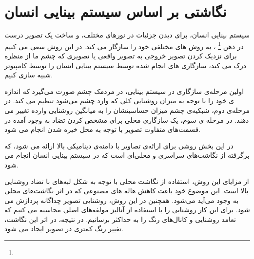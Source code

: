 
\section{نگاشتی بر اساس سیستم بینایی انسان}
سیستم بینایی انسان، برای دیدن جزئیات در نورهای مختلف، و ساخت یک تصویر درست در ذهن
\footnote{}
، به روش های مختلفی خود را سازگار می کند.
 در این روش سعی می کنیم برای نزدیک کردن تصویر خروجی به تصویر واقعی یا تصویری که چشم ما از منظره درک می کند، سازگاری های انجام شده توسط سیستم بینایی انسان را توسط کامپیوتر شبیه سازی کنیم. 
 
 اولین مرحله‌ی سازگاری در سیستم بینایی، در مردمک چشم صورت می‌گیرد که اندازه ی خود را با توجه به میزان روشنایی کلی که وارد چشم می‌شود تنظیم می کند. در مرحله‌ی دوم، شبکیه‌ی چشم میزان حساسیتشان را به میانگین روشنایی وارده تغییر می دهند. در مرحله ی سوم، یک سازگاری محلی برای مشخص کردن تضاد به وجود آمده در قسمت‌های متفاوت تصویر با توجه به محل خیره شدن انجام می شود.
 
در این بخش روشی برای ارائه‌ی تصاویر با دامنه‌ی دینامیکی بالا ارائه می شود، که برگرفته از نگاشت‌های سراسری و محلی‌ای است که در سیستم بینایی انسان انجام می شود. 

از مزایای این روش، استفاده از نگاشت محلی با توجه به شکل لبه‌های با تضاد روشنایی بالا است. این موضوع خود باعث کاهش هاله های مصنوعی که در اثر نگاشت‌های محلی به وجود می‌آید می‌شود.
همچنین در این روش،  روشنایی تصویر  چداگانه پردازش می شود. برای این کار روشنایی را با استفاده از آنالیز مولفه‌های اصلی محاسبه می کنیم که تعامد روشنایی و کانال‌های رنگ را به حداکثر برسانیم. در نتیجه، در اثر این نگاشت، تغییر رنگ کمتری در تصویر ایجاد می شود.

